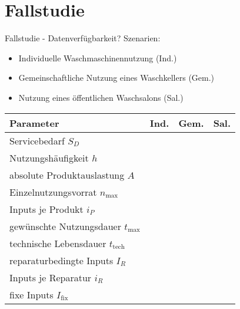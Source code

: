 \documentclass[beamer, xcolor=table]{beamer}
\newcommand{\I}[1]{I_\text{#1}}
\newcommand{\n}[1]{n_\text{#1}}
\renewcommand{\t}[1]{t_\text{#1}}
\begin{document}
\section{Fallstudie}
	\begin{frame}{Fallstudie - Datenverfügbarkeit?}
            Szenarien: 
            \begin{itemize}
                \item Individuelle Waschmaschinennutzung (Ind.)
                \item Gemeinschaftliche Nutzung eines Waschkellers (Gem.)
                \item Nutzung eines öffentlichen Waschsalons (Sal.)
            \end{itemize}
		\begin{center}
\pause
{}
            \begin{tabular}[h]{lccc}
                \hline
            \rowcolor{yellow!70!red}
                Parameter & Ind. & Gem. & Sal.\\
                \hline
                Servicebedarf $S_D$ &&& \pause\\
                Nutzungshäufigkeit $h$ &&& \pause\\
                absolute Produktauslastung $A$ &&&\pause\\
                Einzelnutzungsvorrat $\n{max}$ &&&\pause\\
                Inputs je Produkt $i_P$ &&&\pause\\
                gewünschte Nutzungsdauer $\t{max}$ &&&\pause\\
                technische Lebensdauer $\t{tech}$ &&&\pause\\
                reparaturbedingte Inputs $I_R$ &&&\pause\\
                Inputs je Reparatur $i_R$ &&&\pause\\
                fixe Inputs $\I{fix}$ &&&\\
                \hline
            \end{tabular}

\end{center}
\end{frame}
\end{document}
